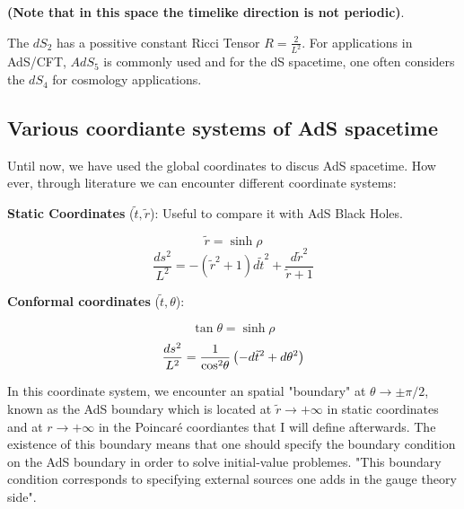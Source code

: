 \documentclass[12pt]{article}
\begin{document}
\textbf{(Note that in this space the timelike direction is not periodic)}.

\vspace{0.5cm}

The \( dS_2 \) has a possitive constant Ricci Tensor \(R = \frac{2}{L^2}\). For applications in AdS/CFT, \( AdS_5 \) is commonly used and for the dS spacetime, one often considers the \( dS_4 \) for cosmology applications.

\subsection{Various coordiante systems of AdS spacetime}

Until now, we have used the global coordinates to discus AdS spacetime. How ever, through literature we can encounter different coordinate systems:

\vspace{0.5cm}

\textbf{Static Coordinates} (\( \tilde{t}, \tilde{r} \)): Useful to compare it with AdS Black Holes.

\begin{equation}
    \tilde{r} = \sinh{ \rho }
\end{equation}
\begin{equation}
    \frac{ds^2}{L^2} = -(\tilde{r}^2 + 1)d\tilde{t}^2 + \frac{d\tilde{r}^2}{\tilde{r} + 1}
\end{equation}

\textbf{Conformal coordinates} (\( \tilde{t}, \theta \)):

\begin{equation}
    \tan{ \theta } = \sinh{ \rho }
\end{equation}
\begin{equation}
    \frac{ds^2}{L^2} = \frac{ 1 }{ \cos^2{ \hspace{-2pt}\theta } }\left(-d\tilde{t}^2+d\theta^2\right)
\end{equation}

In this coordinate system, we encounter an spatial "boundary" at \( \theta \rightarrow \pm \pi/2 \), known as the AdS boundary which is located at \( \tilde{ r } \rightarrow +\infty \) in static coordinates and at \( r \rightarrow +\infty \) in the Poincaré coordiantes that I will define afterwards. The existence of this boundary means that one should specify the boundary condition on the AdS boundary in order to solve initial-value problemes.  "This boundary condition corresponds to specifying external sources one adds in the gauge theory side".
\end{document}

